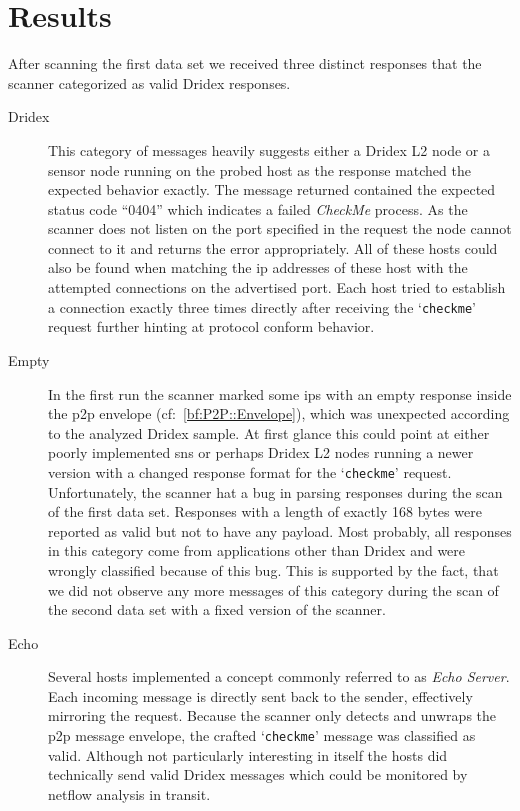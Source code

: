 \section{Results\label{sec:Evaluation::Results}}
After scanning the first data set we received three distinct responses that the scanner categorized as valid Dridex responses.

\begin{description}
    \item[Dridex]
    This category of messages heavily suggests either a Dridex L2 node or a sensor node running on the probed host as the response matched the expected behavior exactly.
    The message returned contained the expected status code ``0404'' which indicates a failed \emph{CheckMe} process.
    As the scanner does not listen on the port specified in the request the node cannot connect to it and returns the error appropriately.
    All of these hosts could also be found when matching the \gls{ip} addresses of these host with the attempted connections on the advertised port.
    Each host tried to establish a connection exactly three times directly after receiving the `\lstinline|checkme|' request further hinting at protocol conform behavior.
    \item[Empty]
    In the first run the scanner marked some \glspl{ip} with an empty response inside the \gls{p2p} envelope (cf:~\autoref{bf:P2P::Envelope}), which was unexpected according to the analyzed Dridex sample.
    At first glance this could point at either poorly implemented \glspl{sn} or perhaps Dridex L2 nodes running a newer version with a changed response format for the `\lstinline|checkme|' request.
    Unfortunately, the scanner hat a bug in parsing responses during the scan of the first data set.
    Responses with a length of exactly 168 bytes were reported as valid but not to have any payload.
    Most probably, all responses in this category come from applications other than Dridex and were wrongly classified because of this bug.
    This is supported by the fact, that we did not observe any more messages of this category during the scan of the second data set with a fixed version of the scanner.
    \item[Echo]
    Several hosts implemented a concept commonly referred to as \emph{Echo Server}.
    Each incoming message is directly sent back to the sender, effectively mirroring the request.
    Because the scanner only detects and unwraps the \gls{p2p} message envelope, the crafted `\lstinline|checkme|' message was classified as valid.
    Although not particularly interesting in itself the hosts did technically send valid Dridex messages which could be monitored by netflow analysis in transit.
\end{description}

